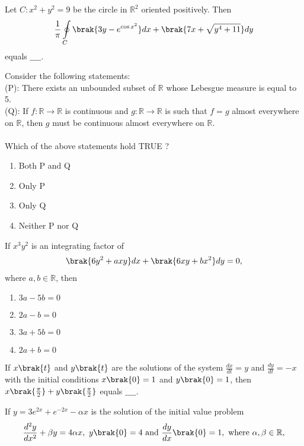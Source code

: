 \item Let $C : x^2 + y^2 = 9$ be the circle in $\mathbb{R}^2$ oriented positively. Then
\begin{align*}
    \frac{1}{\pi} \oint\limits_{C} \brak{3y - e^{\cos x^2}} dx + \brak{7x + \sqrt{y^4 + 11}}dy
\end{align*}
equals $\_\_\_\_$. \\
\item Consider the following statements: \\
(P): There exists an unbounded subset of $\mathbb{R}$ whose Lebesgue measure is equal to 5. \\
(Q): If $f : \mathbb{R} \rightarrow \mathbb{R}$ is continuous and $g : \mathbb{R} \rightarrow \mathbb{R}$ is such that $f = g$ almost everywhere on $\mathbb{R}$, then $g$ must be continuous almost everywhere on $\mathbb{R}$. \\\\
Which of the above statements hold TRUE ?
\begin{enumerate}
    \item Both P and Q
    \item Only P
    \item Only Q
    \item Neither P nor Q \\
\end{enumerate}
\item If $x^3y^2$ is an integrating factor of 
\begin{align*}
    \brak{6y^2 + axy}dx + \brak{6xy + bx^2}dy = 0,
\end{align*}
where $a, b \in \mathbb{R}$, then
\begin{enumerate}
    \item $3a - 5b = 0$
    \item $2a - b = 0$
     \item $3a + 5b = 0$
    \item $2a + b = 0$ \\
\end{enumerate}
\item If $x\brak{t}$ and $y\brak{t}$ are the solutions of the system $\frac{dx}{dt} = y$ and $\frac{dy}{dt} = -x$ with the initial conditions $x\brak{0} = 1$ and $y\brak{0} = 1$, then $x\brak{\frac{\pi}{2}} + y\brak{\frac{\pi}{2}}$ equals $\_\_\_\_$. \\
\item If $y = 3e^{2x} + e^{-2x} - \alpha x$ is the solution of the initial value problem 
\begin{align*}
    \frac{d^2y}{dx^2} + \beta y = 4 \alpha x,\ y\brak{0} = 4\ \text{and}\ \frac{dy}{dx}\brak{0} = 1,\ \text{where}\ \alpha, \beta \in \mathbb{R},
\end{align*}
